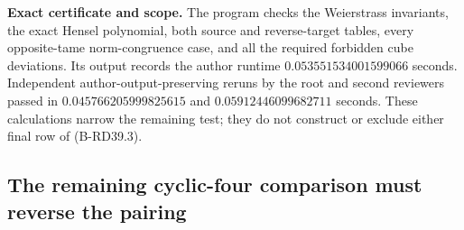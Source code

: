 \par\smallskip\noindent\textbf{Exact certificate and scope.}
The program  checks the
Weierstrass invariants, the exact Hensel polynomial, both source
and reverse-target tables, every opposite-tame norm-congruence
case, and all the required forbidden cube deviations. Its output
records the author runtime $0.053551534001599066$ seconds. Independent
author-output-preserving reruns by the root and second reviewers passed
in $0.045766205999825615$ and $0.05912446099682711$ seconds.
These calculations narrow the remaining test;
they do not construct or exclude either final row of (B-RD39.3).


\subsection{The remaining cyclic-four comparison must reverse the pairing}

